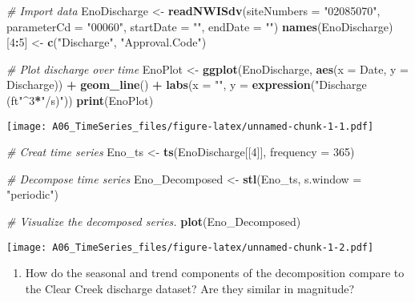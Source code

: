 \documentclass[]{article}
\newenvironment{Shaded}{\begin{snugshade}}{\end{snugshade}}
\newcommand{\CommentTok}[1]{\textcolor[rgb]{0.56,0.35,0.01}{\textit{#1}}}
\newcommand{\DataTypeTok}[1]{\textcolor[rgb]{0.13,0.29,0.53}{#1}}
\newcommand{\DecValTok}[1]{\textcolor[rgb]{0.00,0.00,0.81}{#1}}
\newcommand{\KeywordTok}[1]{\textcolor[rgb]{0.13,0.29,0.53}{\textbf{#1}}}
\newcommand{\NormalTok}[1]{#1}
\newcommand{\OperatorTok}[1]{\textcolor[rgb]{0.81,0.36,0.00}{\textbf{#1}}}
\newcommand{\StringTok}[1]{\textcolor[rgb]{0.31,0.60,0.02}{#1}}
\providecommand{\tightlist}{%
  \setlength{\itemsep}{0pt}\setlength{\parskip}{0pt}}
\begin{document}
\begin{Shaded}
\begin{Highlighting}[]
\CommentTok{# Import data}
\NormalTok{EnoDischarge <-}\StringTok{ }\KeywordTok{readNWISdv}\NormalTok{(}\DataTypeTok{siteNumbers =} \StringTok{"02085070"}\NormalTok{,}
                     \DataTypeTok{parameterCd =} \StringTok{"00060"}\NormalTok{, }
                     \DataTypeTok{startDate =} \StringTok{""}\NormalTok{,}
                     \DataTypeTok{endDate =} \StringTok{""}\NormalTok{)}
\KeywordTok{names}\NormalTok{(EnoDischarge)[}\DecValTok{4}\OperatorTok{:}\DecValTok{5}\NormalTok{] <-}\StringTok{ }\KeywordTok{c}\NormalTok{(}\StringTok{"Discharge"}\NormalTok{, }\StringTok{"Approval.Code"}\NormalTok{)}

\CommentTok{# Plot discharge over time}
\NormalTok{EnoPlot <-}\StringTok{ }
\StringTok{  }\KeywordTok{ggplot}\NormalTok{(EnoDischarge, }\KeywordTok{aes}\NormalTok{(}\DataTypeTok{x =}\NormalTok{ Date, }\DataTypeTok{y =}\NormalTok{ Discharge)) }\OperatorTok{+}
\StringTok{  }\KeywordTok{geom_line}\NormalTok{() }\OperatorTok{+}
\StringTok{  }\KeywordTok{labs}\NormalTok{(}\DataTypeTok{x =} \StringTok{""}\NormalTok{, }\DataTypeTok{y =} \KeywordTok{expression}\NormalTok{(}\StringTok{"Discharge (ft"}\OperatorTok{^}\DecValTok{3}\OperatorTok{*}\StringTok{"/s)"}\NormalTok{))}
\KeywordTok{print}\NormalTok{(EnoPlot)}
\end{Highlighting}
\end{Shaded}

\texttt{[image: A06\_TimeSeries\_files/figure-latex/unnamed-chunk-1-1.pdf]}

\begin{Shaded}
\begin{Highlighting}[]
\CommentTok{# Creat time series}
\NormalTok{Eno_ts <-}\StringTok{ }\KeywordTok{ts}\NormalTok{(EnoDischarge[[}\DecValTok{4}\NormalTok{]], }\DataTypeTok{frequency =} \DecValTok{365}\NormalTok{)}

\CommentTok{# Decompose time series}
\NormalTok{Eno_Decomposed <-}\StringTok{ }\KeywordTok{stl}\NormalTok{(Eno_ts, }\DataTypeTok{s.window =} \StringTok{"periodic"}\NormalTok{)}

\CommentTok{# Visualize the decomposed series. }
\KeywordTok{plot}\NormalTok{(Eno_Decomposed)}
\end{Highlighting}
\end{Shaded}

\texttt{[image: A06\_TimeSeries\_files/figure-latex/unnamed-chunk-1-2.pdf]}

\begin{enumerate}
\def\labelenumi{\arabic{enumi}.}
\setcounter{enumi}{9}
\tightlist
\item
  How do the seasonal and trend components of the decomposition compare
  to the Clear Creek discharge dataset? Are they similar in magnitude?
\end{enumerate}
\end{document}
